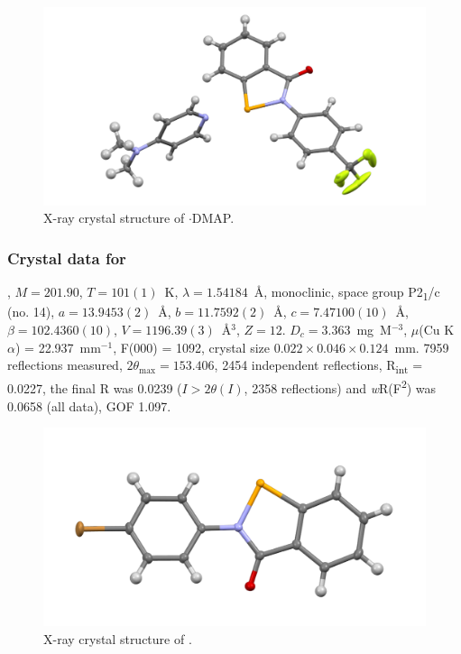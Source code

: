 \begin{refsection}
\begin{figure}
  \includegraphics[width=0.6\linewidth]{Figures/ebs-4cf3-dmap-xtal.pdf}
  \caption{X-ray crystal structure of \texorpdfstring{$ \cdot $DMAP}{C21 H18 F3 N3 O Se}.}
\end{figure}

\subsubsection{Crystal data for \texorpdfstring{}{C13 H8 Br N O Se}}
, $M=201.90$, $T=101(1)$~K, $\lambda=1.54184$~\AA, monoclinic, space group P2\textsubscript{1}/c (no. 14), $a = 13.9453(2)$~\AA, $b = 11.7592(2)$~\AA, $c = 7.47100(10)$~\AA, $\beta = 102.4360(10)$\degree, $V = 1196.39(3)$~\AA$^{3}$, $Z = 12$. $D_{c}= 3.363$~mg~M$^{-3}$, $\mu$(Cu K$\alpha$) = 22.937~mm$^{-1}$, F(000) = 1092, crystal size $0.022 \times 0.046 \times 0.124$~mm. 7959 reflections measured, $2\theta_{\max}=153.406$\degree, 2454 independent reflections, R\textsubscript{int} = 0.0227, the final R was 0.0239 ($I > 2\theta(I)$, 2358 reflections) and \textit{w}R(F\textsuperscript{2}) was 0.0658 (all data), GOF 1.097.

\begin{figure}
  \includegraphics[width=0.6\linewidth]{Figures/ebs-4br-xtal.pdf}
  \caption{X-ray crystal structure of \texorpdfstring{}{C13 H8 Br N O Se}.}
\end{figure}


\end{refsection}

